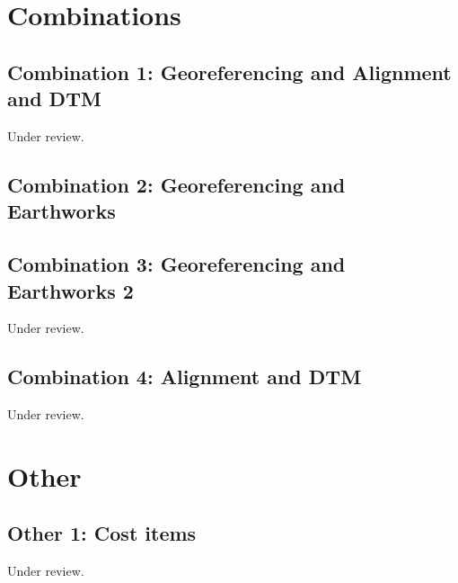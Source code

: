 \documentclass{scrartcl}
\begin{document}
\section{Combinations}

\subsection{Combination 1: Georeferencing and Alignment and DTM}
\label{sec:align_dtm_1}
Under review.%
\clearpage

\subsection{Combination 2: Georeferencing and Earthworks}
\label{sec:georef_earth_1}
\clearpage

\subsection{Combination 3: Georeferencing and Earthworks 2}
\label{sec:georef_earth_2}
Under review.%
\clearpage

\subsection{Combination 4: Alignment and DTM}
\label{sec:align_dtm_2}
Under review.%
\clearpage

\section{Other}

\subsection{Other 1: Cost items}
\label{sec:other_1}
Under review.%
\clearpage
\end{document}
